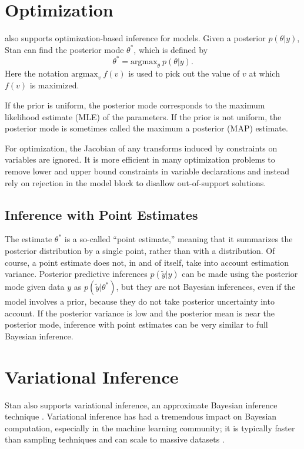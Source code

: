 \section{Optimization}

\Stan also supports optimization-based inference for models.  Given a
posterior $p(\theta|y)$, Stan can find the posterior mode $\theta^*$,
which is defined by
%
\[
\theta^{*} = \mbox{argmax}_{\theta} \ p(\theta|y).
\]
%
Here the notation $\mbox{argmax}_v \ f(v)$ is used to pick out the value
of $v$ at which $f(v)$ is maximized.

If the prior is uniform, the posterior mode corresponds to the maximum
likelihood estimate (MLE) of the parameters.  If the prior is not
uniform, the posterior mode is sometimes called the maximum a
posterior (MAP) estimate. 

For optimization, the Jacobian of any transforms induced by
constraints on variables are ignored.  It is more efficient in many
optimization problems to remove lower and upper bound constraints in
variable declarations and instead rely on rejection in the model
block to disallow out-of-support solutions.


\subsection{Inference with Point Estimates}

The estimate $\theta^{*}$ is a so-called ``point estimate,'' meaning
that it summarizes the posterior distribution by a single point,
rather than with a distribution.  Of course, a point estimate does
not, in and of itself, take into account estimation variance.
Posterior predictive inferences $p(\tilde{y} | y)$ can be made using
the posterior mode given data $y$ as $p(\tilde{y}|\theta^*)$, but they
are not Bayesian inferences, even if the model involves a prior,
because they do not take posterior uncertainty into account.  If the
posterior variance is low and the posterior mean is near the posterior
mode, inference with point estimates can be very similar to full
Bayesian inference.


\section{Variational Inference}

Stan also supports variational inference, an approximate Bayesian inference
technique \citep{Jordan:1999,Wainwright-Jordan:2008}. Variational inference has
had a tremendous impact on Bayesian computation, especially in the machine
learning community; it is typically faster than sampling techniques and can
scale to massive datasets \citep{Hoffman:2013}.

